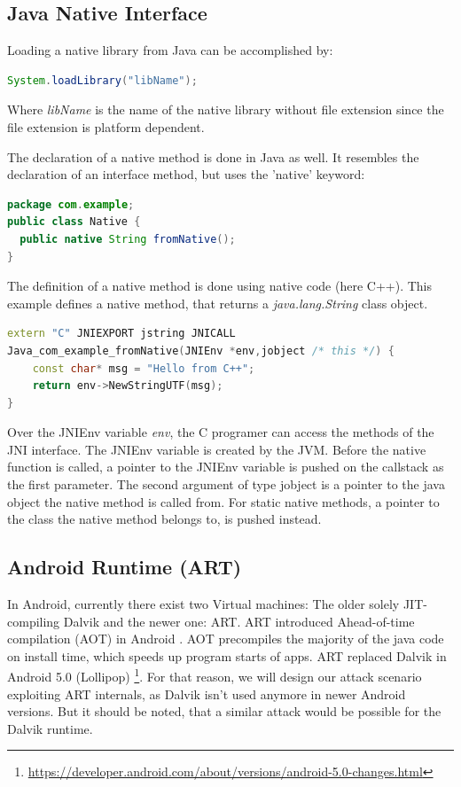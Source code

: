 \subsection{Java Native Interface}

Loading a native library from Java can be accomplished by:
\begin{lstlisting}[language=Java, style=JavaCodeStyle, caption=Loading a native libary]
 System.loadLibrary("libName");
\end{lstlisting}
Where \emph{libName} is the name of the native library without file extension since the file extension is platform dependent.

The declaration of a native method is done in Java as well. It resembles the declaration of an interface method, but uses the 'native' keyword:
\begin{lstlisting}[language=Java, style=JavaCodeStyle, caption= native declaration]
package com.example;
public class Native {
  public native String fromNative();
}
\end{lstlisting}

The definition of  a native method is done using native code (here C++). This example defines a native method, that returns a \emph{java.lang.String} class object.
\begin{lstlisting}[language=C++, style=CppCodeStyle, caption=Native Hello World Example]
extern "C" JNIEXPORT jstring JNICALL
Java_com_example_fromNative(JNIEnv *env,jobject /* this */) {
    const char* msg = "Hello from C++";
    return env->NewStringUTF(msg);
}
\end{lstlisting}

Over the JNIEnv variable \emph{env}, the C programer can access the methods of the JNI interface. The JNIEnv variable is created by the JVM. Before the native function is called, a pointer to the JNIEnv variable is pushed on the callstack as the first parameter. The second argument of type jobject is a pointer to the java object the native method is called from. For static native methods, a pointer to the class the native method belongs to, is pushed instead. 

\subsection{Android Runtime (ART)}
In Android, currently there exist two Virtual machines: The older solely JIT-compiling Dalvik and the newer one: ART. ART introduced Ahead-of-time compilation (AOT) in Android \cite{ArtAndDalvik}. AOT precompiles the majority of the java code on install time, which speeds up program starts of apps. ART replaced Dalvik in Android 5.0 (Lollipop) \footnote{\url{https://developer.android.com/about/versions/android-5.0-changes.html}}. For that reason, we will design our attack scenario exploiting ART internals, as Dalvik isn't used anymore in newer Android versions. But it should be noted, that a similar attack would be possible for the Dalvik runtime.

